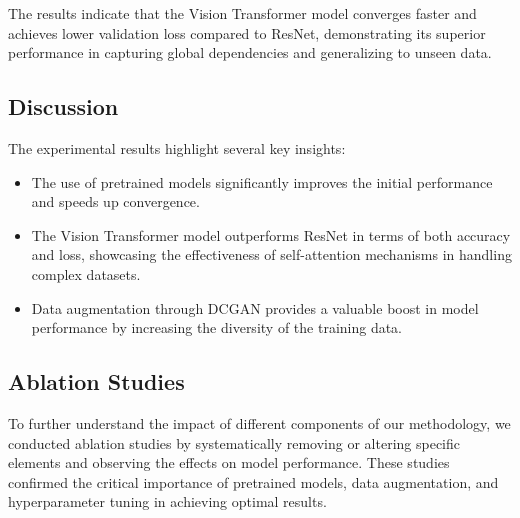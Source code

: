 
The results indicate that the Vision Transformer model converges faster and achieves lower validation loss compared to ResNet, demonstrating its superior performance in capturing global dependencies and generalizing to unseen data.

\subsection{Discussion}
The experimental results highlight several key insights:
\begin{itemize}
    \item The use of pretrained models significantly improves the initial performance and speeds up convergence.
    \item The Vision Transformer model outperforms ResNet in terms of both accuracy and loss, showcasing the effectiveness of self-attention mechanisms in handling complex datasets.
    \item Data augmentation through DCGAN provides a valuable boost in model performance by increasing the diversity of the training data.
\end{itemize}

\subsection{Ablation Studies}
To further understand the impact of different components of our methodology, we conducted ablation studies by systematically removing or altering specific elements and observing the effects on model performance. These studies confirmed the critical importance of pretrained models, data augmentation, and hyperparameter tuning in achieving optimal results.

